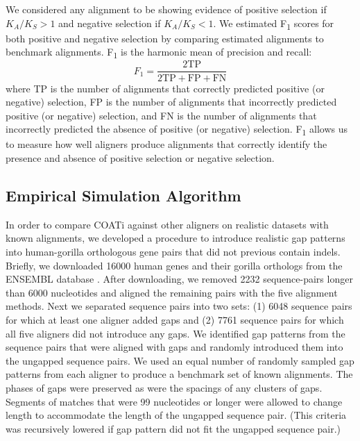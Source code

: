 \documentclass[12pt,letterpaper]{article}
\begin{document}
We considered any alignment to be showing evidence of positive selection if $K_A/K_S > 1$ and negative selection if $K_A/K_S < 1$. We estimated F\textsubscript{1} scores for both positive and negative selection by comparing estimated alignments to benchmark alignments. F\textsubscript{1} is the harmonic mean of precision and recall:
\[
F_1 = \frac{2 \text{TP}}{2 \text{TP} + \text{FP} + \text{FN}}
\]
where TP is the number of alignments that correctly predicted positive (or negative) selection, FP is the number of alignments that incorrectly predicted positive (or negative) selection, and FN is the number of alignments that incorrectly predicted the absence of positive (or negative) selection. F\textsubscript{1} allows us to measure how well aligners produce alignments that correctly identify the presence and absence of positive selection or negative selection.

\subsection*{Empirical Simulation Algorithm}


In order to compare COATi against other aligners on realistic datasets with known alignments, we developed a procedure to introduce realistic gap patterns into human-gorilla orthologous gene pairs that did not previous contain indels. Briefly, we downloaded 16000 human genes and their gorilla orthologs from the ENSEMBL database \citep{ensembl_hubbard_2002}. After downloading, we removed 2232 sequence-pairs longer than 6000 nucleotides and aligned the remaining pairs with the five alignment methods. Next we separated sequence pairs into two sets: (1) 6048 sequence pairs for which at least one aligner added gaps and (2) 7761 sequence pairs for which all five aligners did not introduce any gaps. We identified gap patterns from the sequence pairs that were aligned with gaps and randomly introduced them into the ungapped sequence pairs. We used an equal number of randomly sampled gap patterns from each aligner to produce a benchmark set of known alignments. The phases of gaps were preserved as were the spacings of any clusters of gaps. Segments of matches that were 99 nucleotides or longer were allowed to change length to accommodate the length of the ungapped sequence pair. (This criteria was recursively lowered if gap pattern did not fit the ungapped sequence pair.)
\end{document}
